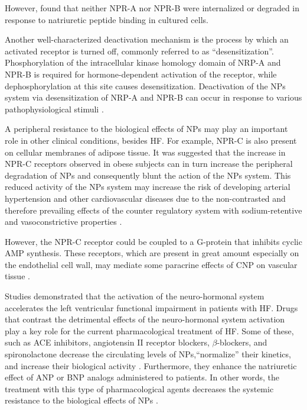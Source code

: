 \documentclass[14pt,a4paper,onecolumn]{extarticle}
\begin{document}
However,  \citep{bib348} found that neither NPR-A nor NPR-B were internalized or degraded in response to natriuretic peptide binding in cultured cells. %



Another well-characterized deactivation mechanism is the process by which an activated receptor is turned off, commonly referred to as “desensitization”. Phosphorylation of the intracellular kinase homology domain of NRP-A and NPR-B is required for hormone-dependent activation of the receptor, while dephosphorylation at this site causes desensitization. Deactivation of the NPs system via desensitization of NRP-A and NPR-B can occur in response to various pathophysiological stimuli \citep{bib348}.%






A peripheral resistance to the biological effects of NPs may play an important role in other clinical conditions, besides HF. For example, NPR-C is also present on cellular membranes of adipose tissue. It was suggested that the increase in NPR-C receptors observed in obese subjects can in turn increase the peripheral degradation of NPs and consequently blunt the action of the NPs system. This reduced activity of the NPs system may increase the risk of developing arterial hypertension and other cardiovascular diseases due to the non-contrasted and therefore prevailing effects of the counter regulatory system with sodium-retentive and vasoconstrictive properties \citep{bib352}.



However, the NPR-C receptor could be coupled to a G-protein that inhibits cyclic AMP synthesis. These receptors, which are present in great amount especially on the endothelial cell wall, may mediate some paracrine effects of CNP on vascular tissue \citep{bib355}.



Studies demonstrated that the activation of the neuro-hormonal system accelerates the left ventricular functional impairment in patients with HF. Drugs that contrast the detrimental effects of the neuro-hormonal system activation play a key role for the current pharmacological treatment of HF. Some of these, such as ACE inhibitors, angiotensin II receptor blockers, $\beta$-blockers, and spironolactone decrease the circulating levels of NPs,“normalize” their kinetics, and increase their biological activity \citep{bib35}. Furthermore, they enhance the natriuretic effect of ANP or BNP analogs administered to patients. In other words, the treatment with this type of pharmacological agents decreases the systemic resistance to the biological effects of NPs \citep{bib333}.
\end{document}
